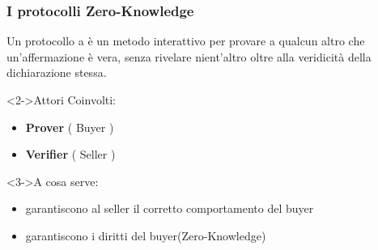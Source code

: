 \begin{frame}
\frametitle{I protocolli Zero-Knowledge}
Un protocollo a  è un metodo interattivo per provare a qualcun altro che un'affermazione è vera, senza rivelare nient'altro oltre alla veridicità della dichiarazione stessa.
\begin{block}<2->{Attori Coinvolti:}
\begin{itemize}
\item \textbf{Prover} ( Buyer )
\item \textbf{Verifier} ( Seller ) 
\end{itemize}
\end{block}
\begin{block}<3->{A cosa serve:}
\begin{itemize}
\item garantiscono al seller il corretto comportamento del buyer
\item garantiscono i diritti del buyer(Zero-Knowledge)
\end{itemize}
\end{block}

\end{frame}

